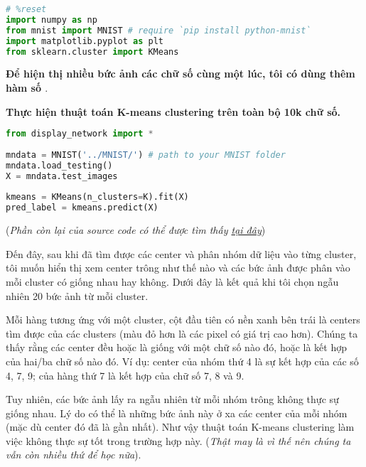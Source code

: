 \begin{lstlisting}[language=Python]
# %reset 
import numpy as np  
from mnist import MNIST # require `pip install python-mnist` 
import matplotlib.pyplot as plt 
from sklearn.cluster import KMeans 
\end{lstlisting}
 
\textbf{Để hiện thị nhiều bức ảnh các chữ số cùng một lúc, tôi có dùng thêm hàm số \href{https://github.com/tiepvupsu/tiepvupsu.github.io/blob/master/assets/kmeans/display_network.py}{}}. 
 
\textbf{Thực hiện thuật toán K-means clustering trên toàn bộ 10k chữ số.} 
 
\begin{lstlisting}[language=Python]
from display_network import * 
 
mndata = MNIST('../MNIST/') # path to your MNIST folder  
mndata.load_testing() 
X = mndata.test_images 
 
kmeans = KMeans(n_clusters=K).fit(X) 
pred_label = kmeans.predict(X) 
\end{lstlisting}
 
(\textit{Phần còn lại của source code có thể được tìm thấy \href{https://github.com/tiepvupsu/tiepvupsu.github.io/blob/master/assets/kmeans/Kmeans2.ipynb}{tại đây}}) 
 
Đến đây, sau khi đã tìm được các center và phân nhóm dữ liệu vào từng cluster, tôi muốn hiển thị xem center trông như thế nào và các bức ảnh được phân vào mỗi cluster có giống nhau hay không. Dưới đây là kết quả khi tôi chọn ngẫu nhiên 20 bức ảnh từ mỗi cluster. 
 
Mỗi hàng tương ứng với một cluster, cột đầu tiên có nền xanh bên trái là centers tìm được của các clusters (màu đỏ hơn là các pixel có giá trị cao hơn). Chúng ta thấy rằng các center đều hoặc là giống với một chữ số nào đó, hoặc là kết hợp của hai/ba chữ số nào đó. Ví dụ: center của nhóm thứ 4 là sự kết hợp của các số 4, 7, 9; của hàng thứ 7 là kết hợp của chữ số 7, 8 và 9.  
 
Tuy nhiên, các bức ảnh lấy ra ngẫu nhiên từ mỗi nhóm trông không thực sự giống nhau. Lý do có thể là những bức ảnh này ở xa các center của mỗi nhóm (mặc dù center đó đã là gần nhất). Như vậy thuật toán K-means clustering làm việc không thực sự tốt trong trường hợp này. (\textit{Thật may là vì thế nên chúng ta vẫn còn nhiều thứ để học nữa}). 
 
